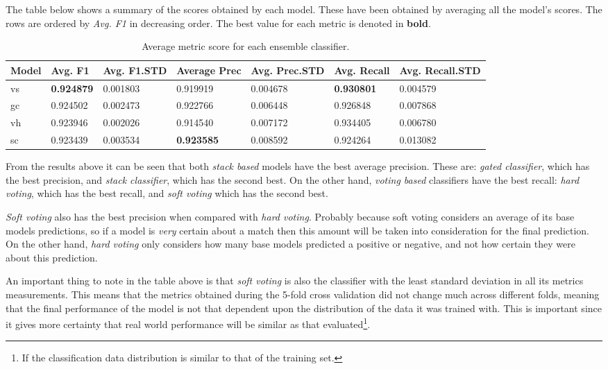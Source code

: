 \documentclass[epsfig,a4paper,11pt,titlepage,twoside,openany]{book}
\begin{document}
The table below shows a summary of the scores obtained by each model. These have been obtained by averaging all the model's scores. The rows are ordered by \textit{Avg. F1} in decreasing order. The best value for each metric is denoted in \textbf{bold}.

\begin{table}[H]
\centering
\begin{tabular}{l|l|l|l|l|l|l}
Model & Avg. F1  & Avg. F1.STD & Average Prec & Avg. Prec.STD & Avg. Recall & Avg. Recall.STD \\ \hline
vs    & \textbf{0.924879} & 0.001803    & 0.919919     & 0.004678      & \textbf{0.930801}    & 0.004579        \\
gc    & 0.924502 & 0.002473    & 0.922766     & 0.006448      & 0.926848    & 0.007868        \\
vh    & 0.923946 & 0.002026    & 0.914540     & 0.007172      & 0.934405    & 0.006780        \\
sc    & 0.923439 & 0.003534    & \textbf{0.923585}     & 0.008592      & 0.924264    & 0.013082          
\end{tabular}
\caption{Average metric score for each ensemble classifier.}
\label{tab:metrics-summary-for-ensembles}
\end{table}

From the results above it can be seen that both \textit{stack based} models have the best average precision. These are: \textit{gated classifier}, which has the best precision, and \textit{stack classifier}, which has the second best. On the other hand, \textit{voting based} classifiers have the best recall: \textit{hard voting}, which has the best recall, and \textit{soft voting} which has the second best.

\textit{Soft voting} also has the best precision when compared with \textit{hard voting}. Probably because soft voting considers an average of its base models predictions, so if a model is \textit{very} certain about a match then this amount will be taken into consideration for the final prediction. On the other hand, \textit{hard voting} only considers how many base models predicted a positive or negative, and not how certain they were about this prediction. 

An important thing to note in the table above is that \textit{soft voting} is also the classifier with the least standard deviation in all its metrics measurements. This means that the metrics obtained during the 5-fold cross validation did not change much across different folds, meaning that the final performance of the model is not that dependent upon the distribution of the data it was trained with. This is important since it gives more certainty that real world performance will be similar as that evaluated\footnote{If the classification data distribution is similar to that of the training set.}. 
\end{document}
